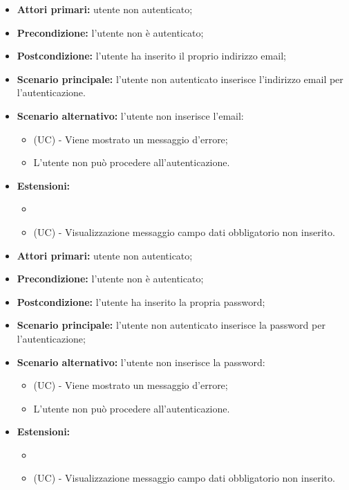\resetSubUC
{}
\begin{itemize}
	\item \textbf{Attori primari:} utente non autenticato;
	\item \textbf{Precondizione:} l'utente non è autenticato;
	\item \textbf{Postcondizione:} l'utente ha inserito il proprio indirizzo email;
	\item \textbf{Scenario principale:} l'utente non autenticato inserisce l'indirizzo email per l'autenticazione.
	\item \textbf{Scenario alternativo:} l'utente non inserisce l'email:
	\begin{itemize}
		\item (UC) - Viene mostrato un messaggio d'errore;
		\item L'utente non può procedere all'autenticazione.
	\end{itemize}
	\item \textbf{Estensioni:}
	\begin{itemize}
		\item \item (UC) - Visualizzazione messaggio campo dati obbligatorio non inserito.
	\end{itemize}
\end{itemize}

\begin{itemize}
	\item \textbf{Attori primari:} utente non autenticato;
	\item \textbf{Precondizione:} l'utente non è autenticato;
	\item \textbf{Postcondizione:} l'utente ha inserito la propria password;
	\item \textbf{Scenario principale:} l'utente non autenticato inserisce la password per l'autenticazione;
	\item \textbf{Scenario alternativo:} l'utente non inserisce la password:
	\begin{itemize}
		\item (UC) - Viene mostrato un messaggio d'errore;
		\item L'utente non può procedere all'autenticazione.
	\end{itemize}
	\item \textbf{Estensioni:}
	\begin{itemize}
		\item \item (UC) - Visualizzazione messaggio campo dati obbligatorio non inserito.
	\end{itemize}
\end{itemize}


